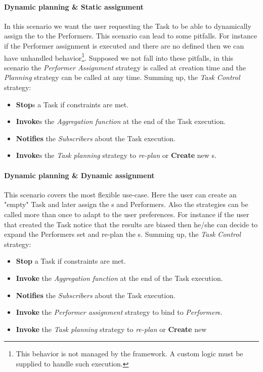 \paragraph{Dynamic \utask{} planning \& Static assignment}
\label{exec:dynamic-static}
In this scenario we want the user requesting the Task to be able to dynamically
assign the \utask{} to the Performers. This scenario can lead to some pitfalls.
For instance if the Performer assignment is executed and there are no \utask{}
defined then we can have unhandled behavior\footnote{This behavior is not
managed by the framework. A custom logic must be supplied to handle such
execution.}. Supposed we not fall into these pitfalls, in this scenario the
\emph{Performer Assignment} strategy is called at creation time and the
\emph{\utask{} Planning} strategy can be called at any time. Summing up, the
\emph{Task Control} strategy:
\begin{itemize}
	\item \textbf{Stop}s a Task if constraints are met.
	\item \textbf{Invoke}s the \emph{Aggregation function} at the end of the Task
	execution.
	\item \textbf{Notifies} the \emph{Subscribers} about the Task execution.
	\item \textbf{Invoke}s the \emph{Task planning} strategy to \emph{re-plan}
	\utask{} or \textbf{Create} new \utask{}s.
\end{itemize}




\paragraph{Dynamic \utask{} planning \& Dynamic assignment}
\label{exec:dynamic-dynamic}
This scenario covers the most flexible use-case. Here the user can create an
"empty" Task and later assign the \utask{}s and Performers. Also the strategies
can be called more than once to adapt to the user preferences. For instance if
the user that created the Task notice that the results are biased then he/she can
decide to expand the Performers set and re-plan the \utask{}s. Summing up, the
\emph{Task Control} strategy:
\begin{itemize}
	\item \textbf{Stop} a Task if constraints are met.
	\item \textbf{Invoke} the \emph{Aggregation function} at the end of the Task
	execution.
	\item \textbf{Notifies} the \emph{Subscribers} about the Task execution.
	\item \textbf{Invoke} the \emph{Performer assignment} strategy to bind \utask{}
	to \emph{Performer}s.
	\item \textbf{Invoke} the \emph{Task planning} strategy to \emph{re-plan}
	\utask{} or \textbf{Create} new \utask{}
\end{itemize}